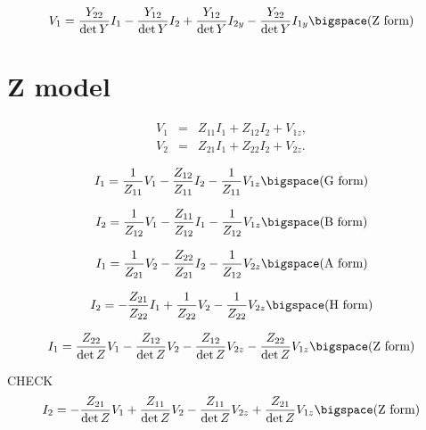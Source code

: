 \documentclass[a4paper, 12pt]{article}
\begin{document}
\begin{equation}
  V_1 = \frac{Y_{22}}{\det{Y}} I_1 - \frac{Y_{12}}{\det{Y}} I_2 + \frac{Y_{12}}{\det{Y}} I_{2y} - \frac{Y_{22}}{\det{Y}} I_{1y} \bigspace \mbox{(Z form)}
\end{equation}



\section{Z model}

\begin{eqnarray}
\label{eqn:ZV1}
  V_1 & = & Z_{11} I_1 + Z_{12} I_2 + V_{1z}, \\
  V_2 & = & Z_{21} I_1 + Z_{22} I_2 + V_{2z}.
\label{eqn:ZV2}
\end{eqnarray}



\begin{equation}
  I_1 = \frac{1}{Z_{11}} V_1 - \frac{Z_{12}}{Z_{11}} I_2 - \frac{1}{Z_{11}} V_{1z} \bigspace \mbox{(G form)}
\end{equation}

\begin{equation}
  I_2 = \frac{1}{Z_{12}} V_1 - \frac{Z_{11}}{Z_{12}} I_1 - \frac{1}{Z_{12}} V_{1z} \bigspace \mbox{(B form)}
\end{equation}

\begin{equation}
  I_1 = \frac{1}{Z_{21}} V_2 - \frac{Z_{22}}{Z_{21}} I_2 - \frac{1}{Z_{12}} V_{2z} \bigspace \mbox{(A form)}
\end{equation}


\begin{equation}
  I_2 = -\frac{Z_{21}}{Z_{22}} I_1 + \frac{1}{Z_{22}} V_2 - \frac{1}{Z_{22}} V_{2z} \bigspace \mbox{(H form)}
\end{equation}


\begin{equation}
  I_1 = \frac{Z_{22}}{\det{Z}} V_1 - \frac{Z_{12}}{\det{Z}} V_2 - \frac{Z_{12}}{\det{Z}} V_{2z} - \frac{Z_{22}}{\det{Z}} V_{1z} \bigspace \mbox{(Z form)}
\end{equation}

CHECK
\begin{equation}
  I_2 = -\frac{Z_{21}}{\det{Z}} V_1 + \frac{Z_{11}}{\det{Z}} V_2 - \frac{Z_{11}}{\det{Z}} V_{2z} + \frac{Z_{21}}{\det{Z}} V_{1z} \bigspace \mbox{(Z form)}
\end{equation}
\end{document}
